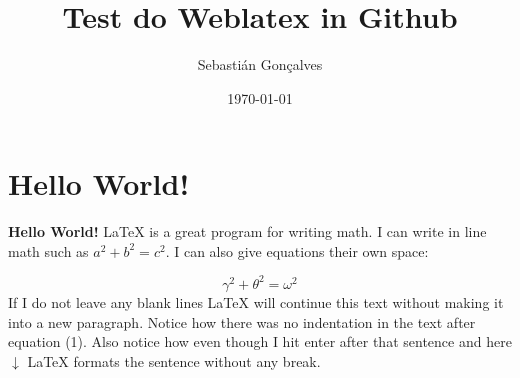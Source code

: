 \documentclass{article}
\title{Test do Weblatex in Github}
\author{Sebastián Gonçalves}
\date{\today}
\begin{document}
 
\maketitle

\section{Hello World!}

\textbf{Hello World!} 
\LaTeX{} is a great program for writing math. 
I can write in line math such as $a^2+b^2=c^2$.
I can also give equations their own space:

\begin{equation} %
  \gamma^2+\theta^2=\omega^2
\end{equation}
If I do not leave any blank lines \LaTeX{} will continue this text without making it into a new paragraph.  Notice how there was no indentation in the text after equation (1).
Also notice how even though I hit enter after that sentence and here $\downarrow$
\LaTeX{} formats the sentence without any break. 
\end{document}
